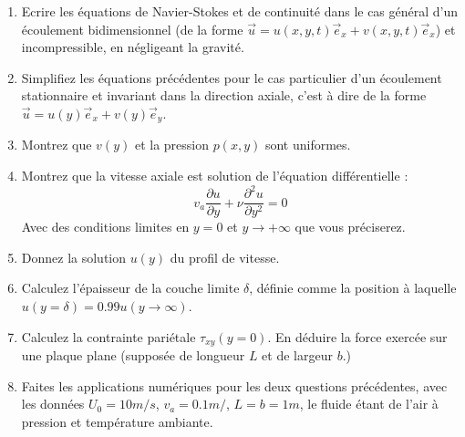 \begin{enumerate}

\item Ecrire les équations de Navier-Stokes et de continuité 
dans le cas général d'un écoulement bidimensionnel
(de la forme $\vec u = u(x,y,t) \vec e_x+v(x,y,t) \vec e_x$)
et incompressible, en négligeant la gravité.

\item Simplifiez les équations précédentes pour le cas particulier d'un
écoulement stationnaire et invariant dans la direction axiale, 
c'est à dire de la forme $\vec u = u(y) \vec e_x + v(y) \vec e_y$. 


\item 
Montrez que $v(y)$ et la pression $p(x,y)$ sont uniformes.

\item 
Montrez que la vitesse axiale est solution de l'équation différentielle :
$$
v_a \frac{\partial u}{\partial y } + \nu 
\frac{\partial^2 u}{\partial y^2 } = 0
$$
Avec des conditions limites en $y=0$ et $y \rightarrow + \infty$ que vous préciserez.


\item Donnez la solution $u(y)$ du profil de vitesse.

\item Calculez l'épaisseur de la couche limite $\delta$, définie comme
la position à laquelle $u(y = \delta ) = 0.99 u(y \rightarrow \infty)$.

\item Calculez la contrainte pariétale $\tau_{xy}(y=0)$. En déduire
la force exercée sur une plaque plane (supposée de longueur $L$ et de largeur
$b$.)

\item Faites les applications numériques pour les deux questions précédentes, avec les données $U_0 = 10 m/s$, $v_a= 0.1 m/$, $L = b = 1m$, le fluide étant de l'air à pression et température ambiante.

\end{enumerate}



